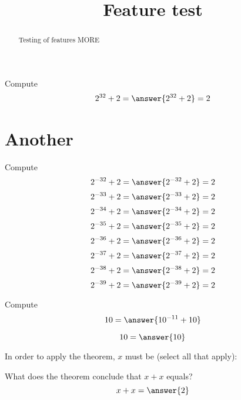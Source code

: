 \documentclass{ximera}
\title{Feature test}
\begin{document}
\begin{abstract}
    Testing of features MORE
\end{abstract}
\maketitle



\begin{example}
  Compute
  \[
  2^{32}+2 = \answer{2^{32}+2} = 2
  \]
  \end{example}

\section{Another}
  \begin{example}
    Compute
    \[
    2^{-32}+2 = \answer{2^{-32}+2} = 2
    \]
    \[
    2^{-33}+2 = \answer{2^{-33}+2} = 2
    \]
    \[
    2^{-34}+2 = \answer{2^{-34}+2} = 2
    \]
    \[
    2^{-35}+2 = \answer{2^{-35}+2} = 2
    \]
    \[
    2^{-36}+2 = \answer{2^{-36}+2} = 2
    \]
    \[
    2^{-37}+2 = \answer{2^{-37}+2} = 2
    \]
    \[
    2^{-38}+2 = \answer{2^{-38}+2} = 2
    \]
    \[
    2^{-39}+2 = \answer{2^{-39}+2} = 2
    \]
    \end{example}


\begin{example}
  Compute
  \[
  10 = \answer{10^{-11}+10}
  \]
  \end{example}
\begin{problem}
  \[
  10 = \answer{10}
  \]
\end{problem}



\begin{question}
  In order to apply the theorem, $x$ must be
  (select all that apply):
  \begin{selectAll}
      \end{selectAll}
      \begin{problem}
      What does the theorem conclude that $x+x$ equals?
      \[
      x + x = \answer{2}
      \]
      \end{problem}
  \end{question}
\begin{exploration}
\end{exploration}
\end{document}
